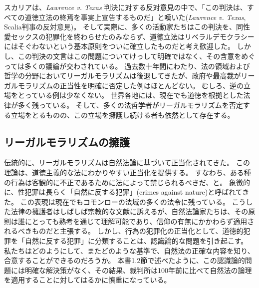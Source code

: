 \documentclass[paper=a4,book,openany]{jlreq}
\begin{document}
スカリアは、\emph{Lawrence v. Texas} 判決に対する反対意見の中で、「この判決は、すべての道徳立法の終焉を事実上宣告するものだ」と嘆いた(\emph{Lawrence v. Texas}, Scalia判事の反対意見)。
そして実際に、多くの活動家たちはこの判決を、同性愛セックスの犯罪化を終わらせたのみならず、道徳立法はリベラルデモクラシーにはそぐわないという基本原則をついに確立したものだと考え歓迎した。
しかし、この判決の文言はこの問題についてけっして明確ではなく、その含意をめぐっては多くの議論が交わされている。
過去数十年間にわたり、法の領域および哲学の分野においてリーガルモラリズムは後退してきたが、政府や最高裁がリーガルモラリズムの正当性を明確に否定した例はほとんどない。
むしろ、逆の立場をとっている例は少なくない。
世界各地には、現在でも道徳を根拠とした法律が多く残っている。
そして、多くの法哲学者がリーガルモラリズムを否定する立場をとるものの、この立場を擁護し続ける者も依然として存在する。

\subsection{リーガルモラリズムの擁護}

伝統的に、リーガルモラリズムは自然法論に基づいて正当化されてきた。
この理論は、道徳主義的な法にわかりやすい正当化を提供する。
すなわち、ある種の行為は客観的に不正であるために法によって禁じられるべきだ、と。
象徴的に、性犯罪は長らく「自然に反する犯罪」(crimes against nature)と呼ばれてきた。
この表現は現在でもコモンローの法域の多くの法令に残っている。
こうした法律の擁護者はしばしば宗教的な文献に訴えるが、自然法論家たちは、その原則は誰にとっても熟考を通じて理解可能であり、信仰の有無にかかわらず適用されるべきものだと主張する。
しかし、行為の犯罪化の正当化として、道徳的犯罪を「自然に反する犯罪」に分類することは、認識論的な問題を引き起こす。
私たちはどのようにして、またどのような基準で、自然法の正確な内容を知り、合意することができるのだろうか。
本書1.2節で述べたように、この認識論的問題には明確な解決策がなく、その結果、裁判所は100年前に比べて自然法の論理を適用することに対してはるかに慎重になっている。
\end{document}
